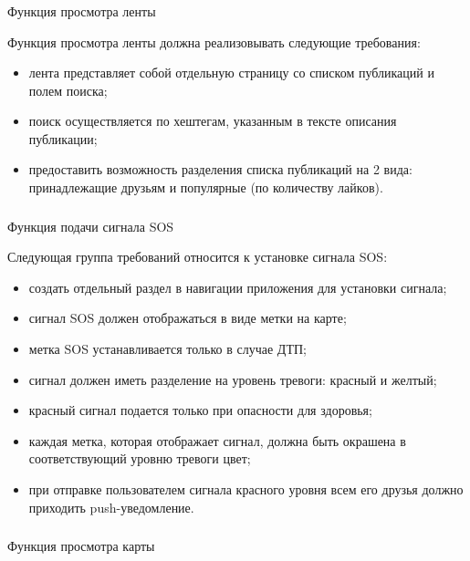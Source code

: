 \subsubsection{} Функция просмотра ленты
\label{sec:domain:specification:student_history}

Функция просмотра ленты должна реализовывать следующие требования:
\begin{itemize}
	\item лента представляет собой отдельную страницу со списком публикаций и полем поиска;
	\item поиск осуществляется по хештегам, указанным в тексте описания публикации;
	\item предоставить возможность разделения списка публикаций на 2 вида: принадлежащие друзьям и популярные (по количеству лайков).
\end{itemize}

\subsubsection{} Функция подачи сигнала SOS
\label{sec:domain:specification:student_history}

Следующая группа требований относится к установке сигнала SOS:
\begin{itemize}
	\item создать отдельный раздел в навигации приложения для установки сигнала;
	\item сигнал SOS должен отображаться в виде метки на карте;
	
	\item метка SOS устанавливается только в случае ДТП;
	
	\item сигнал должен иметь разделение на уровень тревоги: красный и желтый;
	\item красный сигнал подается только при опасности для здоровья;
	\item каждая метка, которая отображает сигнал, должна быть окрашена в соответствующий уровню тревоги цвет;
	\item при отправке пользователем сигнала красного уровня всем его друзья должно приходить push-уведомление.
\end{itemize}

\subsubsection{} Функция просмотра карты
\label{sec:domain:specification:student_history}

